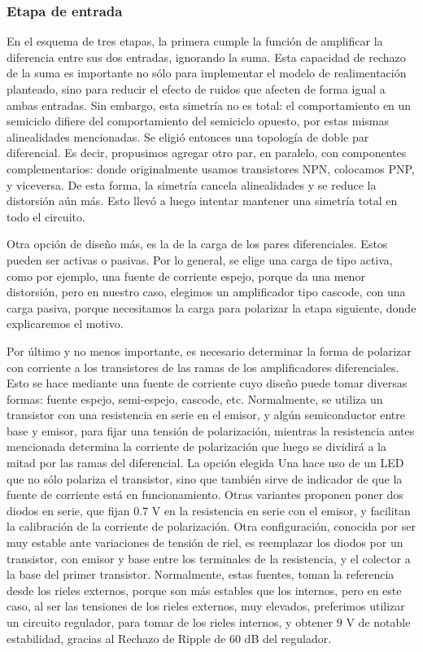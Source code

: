 \documentclass[a4paper,12pt,twoside]{article}
\begin{document}
\subsubsection{Etapa de entrada}

En el esquema de tres etapas, la primera cumple la función de amplificar la diferencia entre sus dos entradas, ignorando la suma. Esta capacidad de rechazo de la suma es importante no sólo para implementar el modelo de realimentación planteado, sino para reducir el efecto de ruidos que afecten de forma igual a ambas entradas.
Sin embargo, esta simetría no es total: el comportamiento en un semiciclo difiere del comportamiento del semiciclo opuesto, por estas mismas alinealidades mencionadas. Se eligió entonces una topología de doble par diferencial. Es decir, propusimos agregar otro par, en paralelo, con componentes complementarios: donde originalmente usamos transistores NPN, colocamos PNP, y viceversa. De esta forma, la simetría cancela alinealidades y se reduce la distorsión aún más. Esto llevó a luego intentar mantener una simetría total en todo el circuito. 


Otra opción de diseño más, es la de la carga de los pares diferenciales. Estos pueden ser activas o pasivas. Por lo general, se elige una carga de tipo activa, como por ejemplo, una fuente de corriente espejo, porque da una menor distorsión, pero en nuestro caso, elegimos un amplificador tipo cascode, con una carga pasiva, porque necesitamos la carga para polarizar la etapa siguiente, donde explicaremos el motivo. 



Por último y no menos importante, es necesario determinar la forma de polarizar con corriente a los transistores de las ramas de los amplificadores diferenciales. Esto se hace mediante una fuente de corriente cuyo diseño puede tomar diversas formas: fuente espejo, semi-espejo, cascode, etc. Normalmente, se utiliza un transistor con una resistencia en serie en el emisor, y algún semiconductor entre base y emisor, para fijar una tensión de polarización, mientras la resistencia antes mencionada determina la corriente de polarización que luego se dividirá a la mitad por las ramas del diferencial. La opción elegida Una hace uso de un LED que no sólo polariza el transistor, sino que también sirve de indicador de que la fuente de corriente está en funcionamiento. Otras variantes proponen poner dos diodos en serie, que fijan $0.7$ V en la resistencia en serie con el emisor, y facilitan la calibración de la corriente de polarización. Otra configuración, conocida por ser muy estable ante variaciones de tensión de riel, es reemplazar los diodos por un transistor, con emisor y base entre los terminales de la resistencia, y el colector a la base del primer transistor. Normalmente, estas fuentes, toman la referencia desde los rieles externos, porque son más estables que los internos, pero en este caso, al ser las tensiones de los rieles externos, muy elevados, preferimos utilizar un circuito regulador, para tomar de los rieles internos, y obtener $9$ V de notable estabilidad, gracias al Rechazo de Ripple de $60$ dB del regulador.
\end{document}
